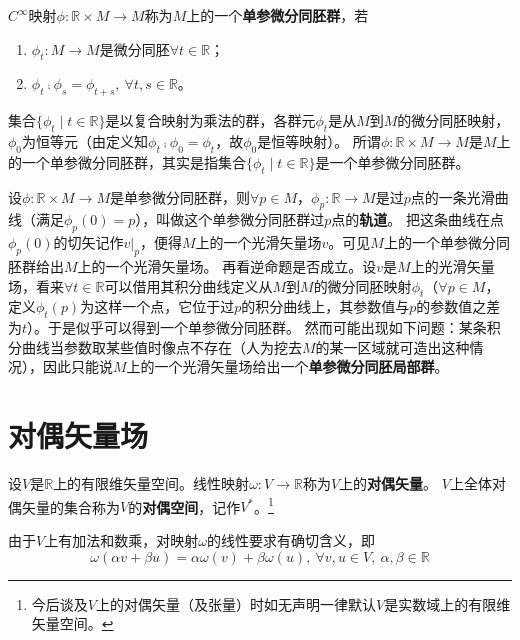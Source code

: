 \begin{definition}
$C^\infty$映射$\phi \colon \mathbb{R} \times M \to M$称为$M$上的一个\textbf{单参微分同胚群}，若
\begin{enumerate}[（a）]
\item $\phi_t \colon M \to M$是微分同胚$\forall t \in \mathbb{R}$；
\item $\phi_t \comp \phi_s = \phi_{t + s}, ~ \forall t, s \in \mathbb{R}$。
\end{enumerate}
\end{definition}

\begin{note}
集合$\{\phi_t \mid t \in \mathbb{R}\}$是以复合映射为乘法的群，各群元$\phi_t$是从$M$到$M$的微分同胚映射，$\phi_0$为恒等元（由定义知$\phi_t \comp \phi_0 = \phi_t$，故$\phi_0$是恒等映射）。
所谓$\phi \colon \mathbb{R} \times M \to M$是$M$上的一个单参微分同胚群，其实是指集合$\{\phi_t \mid t \in \mathbb{R}\}$是一个单参微分同胚群。
\end{note}

设$\phi \colon \mathbb{R} \times M \to M$是单参微分同胚群，则$\forall p \in M$，$\phi_p \colon \mathbb{R} \to M$是过$p$点的一条光滑曲线（满足$\phi_p(0) = p$），叫做这个单参微分同胚群过$p$点的\textbf{轨道}。
把这条曲线在点$\phi_p(0)$的切矢记作$v|_p$，便得$M$上的一个光滑矢量场$v$。可见$M$上的一个单参微分同胚群给出$M$上的一个光滑矢量场。
再看逆命题是否成立。设$v$是$M$上的光滑矢量场，看来$\forall t \in \mathbb{R}$可以借用其积分曲线定义从$M$到$M$的微分同胚映射$\phi_t$（$\forall p \in M$，定义$\phi_t(p)$为这样一个点，它位于过$p$的积分曲线上，其参数值与$p$的参数值之差为$t$）。于是似乎可以得到一个单参微分同胚群。
然而可能出现如下问题：某条积分曲线当参数取某些值时像点不存在（人为挖去$M$的某一区域就可造出这种情况），因此只能说$M$上的一个光滑矢量场给出一个\textbf{单参微分同胚局部群}。

\section{对偶矢量场}

\begin{definition}
设$V$是$\mathbb{R}$上的有限维矢量空间。线性映射$\omega \colon V \to \mathbb{R}$称为$V$上的\textbf{对偶矢量}。
$V$上全体对偶矢量的集合称为$V$的\textbf{对偶空间}，记作$V^*$。\footnote{
今后谈及$V$上的对偶矢量（及张量）时如无声明一律默认$V$是实数域上的有限维矢量空间。
}
\end{definition}

\begin{note}
由于$V$上有加法和数乘，对映射$\omega$的线性要求有确切含义，即
$$\omega(\alpha v + \beta u) = \alpha\omega(v) + \beta\omega(u), ~ \forall v, u \in V, ~ \alpha, \beta \in \mathbb{R}$$
\end{note}

